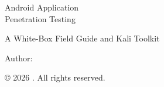 \frontmatter
\begin{titlepage}
\centering
\vspace*{6.2cm}
{\color{titlegrey}\fontsize{40}{50}\selectfont Android Application\\ Penetration Testing\par}
\vspace{14pt}
{\color{titlegrey}\fontsize{18}{24}\selectfont A White-Box Field Guide and Kali Toolkit\par}
\vspace{2.6cm}
{\color{subgrey}\large{}Author: \guideauthor\par}
\vfill
\raggedright{\sffamily\small © 2026 \guideauthor. All rights reserved.}
\end{titlepage}

